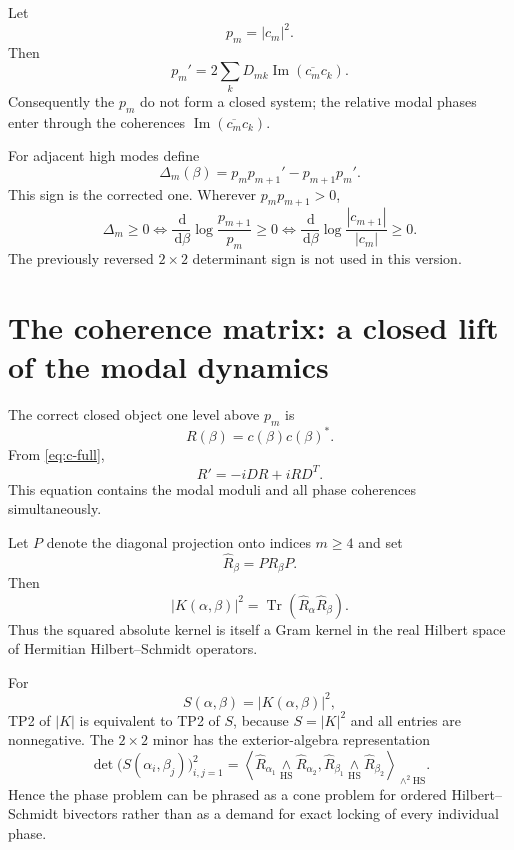 \documentclass[11pt]{amsart}
\numberwithin{equation}{section}
\theoremstyle{plain}
\theoremstyle{definition}
\theoremstyle{remark}
\newcommand{\Imm}{\operatorname{Im}}
\newcommand{\Tr}{\operatorname{Tr}}
\newcommand{\dd}{\,\mathrm d}
\newcommand{\ip}[2]{\left\langle #1,#2\right\rangle}
\newcommand{\wedgeHS}{\mathop{\wedge}\limits_{\mathrm{HS}}}
\begin{document}
Let
\begin{equation}
p_m=|c_m|^2.
\end{equation}
Then
\begin{equation}
\boxed{
p_m'
=2\sum_kD_{mk}\Imm(\overline{c_m}c_k).
}
\label{eq:pprime}
\end{equation}
Consequently the $p_m$ do not form a closed system; the relative modal phases enter through the coherences $\Imm(\overline{c_m}c_k)$.

For adjacent high modes define
\begin{equation}
\boxed{
\Delta_m(\beta)
=p_m p_{m+1}'-p_{m+1}p_m'.
}
\label{eq:Delta-correct}
\end{equation}
This sign is the corrected one.  Wherever $p_mp_{m+1}>0$,
\begin{equation}
\boxed{
\Delta_m\ge0
\iff
\frac{\dd}{\dd\beta}\log\frac{p_{m+1}}{p_m}\ge0
\iff
\frac{\dd}{\dd\beta}\log\frac{|c_{m+1}|}{|c_m|}\ge0.
}
\label{eq:RC}
\end{equation}
The previously reversed $2\times2$ determinant sign is not used in this version.

\section{The coherence matrix: a closed lift of the modal dynamics}
\label{sec:coherence}

The correct closed object one level above $p_m$ is
\begin{equation}
\boxed{R(\beta)=c(\beta)c(\beta)^*.}
\label{eq:R}
\end{equation}
From \eqref{eq:c-full},
\begin{equation}
\boxed{
R'=-iDR+iRD^T.
}
\label{eq:Rflow}
\end{equation}
This equation contains the modal moduli and all phase coherences simultaneously.

Let $P$ denote the diagonal projection onto indices $m\ge4$ and set
\begin{equation}
\widehat R_\beta=PR_\beta P.
\end{equation}
Then
\begin{equation}
\boxed{
|K(\alpha,\beta)|^2
=\Tr(\widehat R_\alpha\widehat R_\beta).
}
\label{eq:K-R}
\end{equation}
Thus the squared absolute kernel is itself a Gram kernel in the real Hilbert space of Hermitian Hilbert--Schmidt operators.

For
\begin{equation}
S(\alpha,\beta)=|K(\alpha,\beta)|^2,
\end{equation}
TP2 of $|K|$ is equivalent to TP2 of $S$, because $S=|K|^2$ and all entries are nonnegative.  The $2\times2$ minor has the exterior-algebra representation
\begin{equation}
\boxed{
\det\bigl(S(\alpha_i,\beta_j)\bigr)_{i,j=1}^2
=
\ip{
\widehat R_{\alpha_1}\wedgeHS\widehat R_{\alpha_2}
}{
\widehat R_{\beta_1}\wedgeHS\widehat R_{\beta_2}
}_{\wedge^2\mathrm{HS}}.
}
\label{eq:HS-wedge}
\end{equation}
Hence the phase problem can be phrased as a cone problem for ordered Hilbert--Schmidt bivectors rather than as a demand for exact locking of every individual phase.
\end{document}
